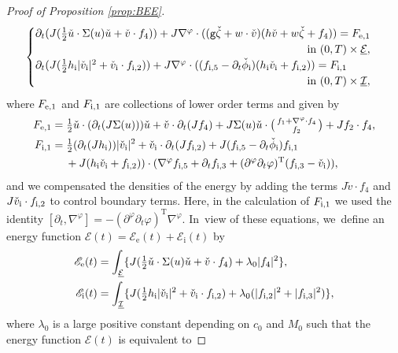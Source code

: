 \documentclass[JEP,XML,SOM,Unicode,NoFloatCountersInSection,published]{cedram}
\newcommand{\gr}{{\mathtt g}}
\newcommand{\dt}{\partial_t}
\newcommand{\cI}{{\mathcal I}}
\newcommand{\cE}{{\mathcal E}}
\newcommand{\ul}[1]{\underline{#1}}
\theoremstyle{definition}
\begin{document}
\begin{proof}[Proof of Proposition \ref{prop:BEE}]
\[\begin{cases}
\dt(J(\frac12\check{u}\cdot\Sigma(u)\check{u}+\check{v}\cdot f_4))
+ J\nabla^\varphi\cdot((\gr\check{\zeta}+w\cdot\check{v})(h\check{v}+w\check{\zeta}+f_4)) = F_{{\rm e},1} \\
\hfill \text{in } (0,T)\times\ul{\cE}, \\
\dt(J(\frac12h_\mathrm{i}|\check{v}_\mathrm{i}|^2 + \check{v}_\mathrm{i}\cdot f_{{\rm i},2}))
+ J\nabla^\varphi\cdot((f_{{\rm i},5}-\dt\check{\phi}_\mathrm{i})(h_\mathrm{i}\check{v}_\mathrm{i}+f_{{\rm i},2})) = F_{{\rm i},1} \\
\hfill \text{in } (0,T)\times\ul{\cI},
\end{cases}
\]
where $F_{{\rm e},1}$ and $F_{{\rm i},1}$ are collections of lower order terms and given by
\begin{align*}
F_{{\rm e},1}
&= \tfrac12\check{u}\cdot(\dt(J\Sigma(u)))\check{u} + \check{v}\cdot\dt(Jf_4)
+ J\Sigma(u)\check{u}\cdot\bigl(\begin{smallmatrix} f_1+\nabla^\varphi\cdot f_4 \\ f_2 \end{smallmatrix} \bigr) + Jf_2\cdot f_4, \\
F_{{\rm i},1}
&= \tfrac12(\dt(Jh_\mathrm{i}))|\check{v}_\mathrm{i}|^2 + \check{v}_\mathrm{i}\cdot\dt(Jf_{{\rm i},2})
+ J(f_{{\rm i},5}-\dt\check{\phi}_\mathrm{i})f_{{\rm i},1} \\
&\quad\;
+ J(h_\mathrm{i}\check{v}_\mathrm{i}+f_{{\rm i},2}))\cdot(\nabla^\varphi f_{{\rm i},5}+\dt f_{{\rm i},3}
+ (\partial^\varphi\dt\varphi)^\mathrm{T}(f_{{\rm i},3}-\check{v}_\mathrm{i})),
\end{align*}
and we compensated the densities of the energy by adding the terms $J\check{v}\cdot f_4$ and $J\check{v}_\mathrm{i}\cdot f_{{\rm i},2}$ to control boundary terms.
Here, in the calculation of $F_{{\rm i},1}$ we used the identity $[\dt,\nabla^\varphi]=-(\partial^\varphi\dt\varphi)^\mathrm{T}\nabla^\varphi$. In~view of these equations, we~define an energy function $\mathscr{E}(t)=\mathscr{E}_\mathrm{e}(t)+\mathscr{E}_\mathrm{i}(t)$ by
\begin{align*}
\mathscr{E}_\mathrm{e}(t)
&= \int_{\ul{\cE}}\{ J(\tfrac12\check{u}\cdot\Sigma(u)\check{u}+\check{v}\cdot f_4) + \lambda_0|f_4|^2 \}, \\
\mathscr{E}_\mathrm{i}(t)
&= \int_{\ul{\cI}}\{ J(\tfrac12h_\mathrm{i}|\check{v}_\mathrm{i}|^2 + \check{v}_\mathrm{i}\cdot f_{{\rm i},2}) + \lambda_0(|f_{{\rm i},2}|^2+|f_{{\rm i},3}|^2) \},
\end{align*}
where $\lambda_0$ is a large positive constant depending on $c_0$ and $M_0$ such that the energy function $\mathscr{E}(t)$ is equivalent to

\end{proof}
\end{document}
